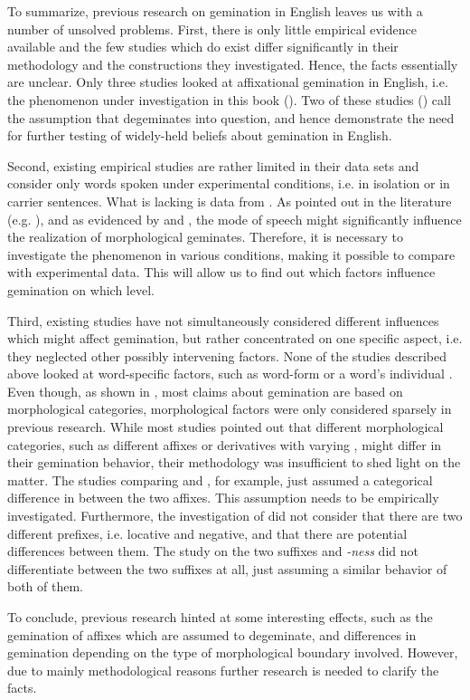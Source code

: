 To summarize, previous research on gemination in English leaves us with a number of unsolved problems. First, there is only little empirical evidence available and the few studies which do exist differ significantly in their methodology and the constructions they investigated. Hence, the facts essentially are unclear. Only three studies looked at affixational gemination in English, i.e. the phenomenon under investigation in this book (\citealt{Kaye.2005, Oh.2012, Kotzor.2016}). Two of these studies (\citealt{Kaye.2005, Oh.2012}) call the assumption that  {degeminates} into question, and hence demonstrate the need for further testing of widely-held beliefs about gemination in English. 

Second, existing empirical studies are rather limited in their data sets and consider only words spoken under experimental conditions, i.e. in isolation or in carrier sentences. What is lacking is data from . As pointed out in the literature (e.g. \citealt{Giegerich.1992, Bauer.2013}), and as evidenced by \cite{Oh.2012} and \cite{Oh.2013}, the mode of speech might significantly influence the realization of  morphological geminates. Therefore, it is necessary to investigate the phenomenon in various conditions, making it possible to compare  with experimental data. This will allow us to find out which factors influence gemination on which level.

Third, existing studies have not simultaneously considered different influences which might affect gemination, but rather concentrated on one specific aspect, i.e. they neglected other possibly intervening factors. None of the studies described above looked at word-specific factors, such as word-form  or a word's individual . Even though, as shown in , most claims about gemination are based on morphological categories, morphological factors were only considered sparsely in previous research. While most studies pointed out that different morphological categories, such as different affixes or derivatives with varying , might differ in their gemination behavior, their methodology was insufficient to shed light on the matter. 
The studies comparing  and , for example, just assumed a categorical difference in  between the two affixes. This assumption needs to be empirically investigated. Furthermore, the investigation of  did not consider that there are two different prefixes, i.e. locative and negative, and that there are potential differences between them. The study on the two suffixes  and \textit{-ness} did not differentiate between the two suffixes at all, just assuming a similar behavior of both of them. 

To conclude, previous research hinted at some interesting effects, such as the gemination of affixes which are assumed to {degeminate}, and differences in gemination depending on the type of morphological boundary involved. However, due to mainly methodological reasons further research is needed to clarify the facts.

